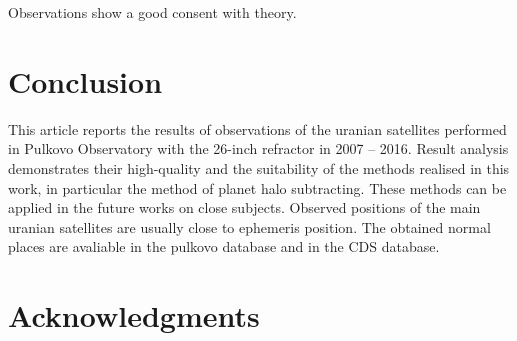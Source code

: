 \documentclass[]{article}
\begin{document}
\begin{figure}[h!]
\begin{minipage}[h]{0.49\linewidth}
\end{minipage}
\begin{minipage}[h]{0.49\linewidth}
\end{minipage}
\end{figure}

 Observations show a good consent with theory.\par

\section{Conclusion}
This article reports the results of observations of the uranian satellites performed in Pulkovo Observatory with the 26-inch refractor in 2007 -- 2016. Result analysis demonstrates their high-quality and the suitability of the methods realised in this work, in particular the method of planet halo subtracting. These methods can be applied in the future works on close subjects. Observed positions of the main uranian satellites are usually close to ephemeris position. The obtained normal places are avaliable in the pulkovo database and in the CDS database.

\section{Acknowledgments}
\end{document}
